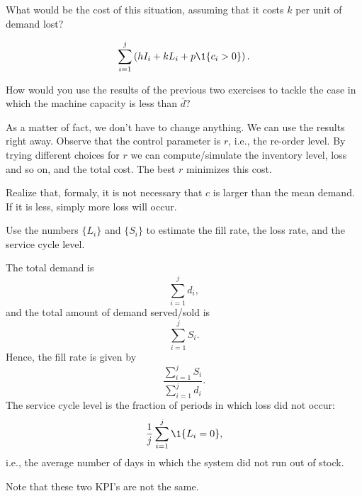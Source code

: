\begin{question}
  What would be the cost of this situation, assuming that it costs $k$
  per unit of demand lost? 
\begin{solution}
  \begin{equation*}
    \sum_{i=1}^j \left(h I_{i} + k L_i + p\1{c_i>0}\right).
  \end{equation*}
\end{solution}
\end{question}

\begin{question}
  How would you use the results of the previous two exercises to tackle the case in which the machine capacity is less than $\bar d$?
  \begin{solution}
    As a matter of fact, we don't have to change anything. We can use
    the results right away. Observe that the control parameter is $r$,
    i.e., the re-order level. By trying different choices for $r$ we
    can compute/simulate the inventory level, loss and so on, and the
    total cost. The best $r$ minimizes this cost.

    Realize that, formaly, it is not necessary that $c$ is larger than
    the mean demand. If it is less, simply more loss will occur.
  \end{solution}
\end{question}


\begin{question}
  Use the numbers $\{L_i\}$ and $\{S_i\}$ to estimate the fill rate,
  the loss rate, and the service cycle level.
\begin{solution}
The total demand is
\begin{equation*}
 \sum_{i=1}^j d_i, 
\end{equation*}
and the total amount of demand served/sold is 
\begin{equation*}
 \sum_{i=1}^j S_i.
\end{equation*}
Hence, the fill rate is given by
\begin{equation*}
  \frac{\sum_{i=1}^j S_i}{\sum_{i=1}^j d_i}.
\end{equation*}
The service cycle level is the fraction of periods in which loss did not occur:
\begin{equation*}
  \frac 1 j \sum_{i=1}^j \1{L_i=0}, 
\end{equation*}
i.e., the average number of days in which the system did not run out of stock.

Note that these two KPI's are not the same. 
\end{solution}
\end{question}

